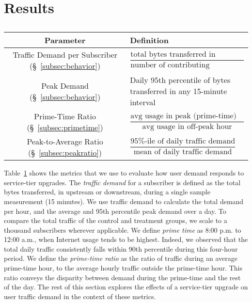 \section{Results}\label{sec:analysis}

\begin{table}[t]
\centering
\begin{small}
\begin{tabular}{| c | p{2.44in} |}\hline
\textbf{Parameter} & \textbf{Definition}	\\\hline
Traffic Demand per Subscriber (\S~\ref{subsec:behavior})	& \(\dfrac{\text{total bytes transferred in 
measurement int.}}{\text{number of contributing subscribers}}\)	\\
Peak Demand (\S~\ref{subsec:behavior})			& Daily 95th percentile of bytes transferred in any 
15-minute interval \\ 
Prime-Time Ratio (\S~\ref{subsec:primetime}) 	& \( \dfrac{ \text{avg usage in peak (prime-time) 
hour}}{ \text{avg usage in off-peak hour}}\) 		\\
Peak-to-Average Ratio (\S~\ref{subsec:peakratio}) 	& \(\dfrac{\text{95\%-ile of daily traffic 
demand}}{\text{mean of daily traffic demand}}\)	\\\hline
\end{tabular}
\end{small}
\caption{}
\label{tab:eval-criteria}
\end{table}

Table~\ref{tab:eval-criteria} shows the metrics that we use to evaluate
how user demand responds to service-tier upgrades. The \emph{traffic
  demand} for a subscriber is defined as the total bytes transferred, in
upstream or downstream, during a single sample measurement (15 minutes).
We use traffic demand to calculate the total demand per hour, and the
average and 95th percentile peak demand over a day. To compare the total
traffic of the control and treatment groups, we scale to a thousand
subscribers wherever applicable. We
define \emph{prime time} as 8:00 p.m. to 12:00 a.m., when Internet usage
tends to be highest.  Indeed, we
observed that the total daily traffic consistently falls within 90th percentile
during this four-hour period. We define the \emph{prime-time ratio} as
the ratio of traffic during an average prime-time hour, to the average
hourly traffic outside the prime-time hour.  This ratio conveys the
disparity between demand during the prime-time and the rest of the day.
The rest of this section explores the effects of a service-tier upgrade
on user traffic demand in the context of these metrics.









%